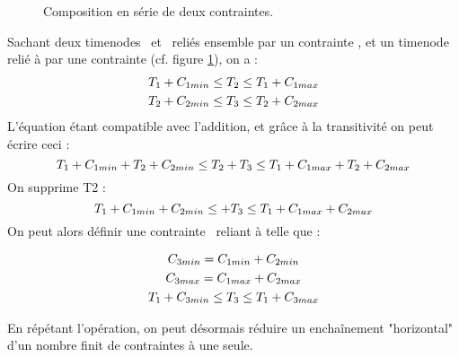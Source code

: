 \begin{figure}[ht]
    \centering
    \caption{Composition en série de deux contraintes. \label{figSerie}}
\end{figure}
\setcounter{equation}{0}
Sachant deux timenodes ~et ~reliés ensemble par un contrainte , et un timenode  relié à  par une contrainte  (cf. figure \ref{figSerie}), on a :
\begin{gather} 
    T_{1} + C_{1min} \leq T_{2} \leq T_{1} + C_{1max}\\
    T_{2} + C_{2min} \leq T_{3} \leq T_{2} + C_{2max}
\end{gather}
L'équation étant compatible avec l'addition, et grâce à la transitivité on peut écrire ceci : 
\begin{equation}
    T_{1} + C_{1min} + T_{2} + C_{2min} \leq T_{2} + T_{3} \leq T_{1} + C_{1max} +         T_{2} + C_{2max}
\end{equation} 
On supprime T2 :
\begin{equation}
    T_{1} + C_{1min} + C_{2min} \leq + T_{3} \leq T_{1} + C_{1max} + C_{2max}
\end{equation}
On peut alors définir une contrainte ~reliant  à  telle que : 

\begin{gather}
    C_{3min} = C_{1min} + C_{2min}\\
    C_{3max} = C_{1max} + C_{2max}\\
    T_{1} + C_{3min} \leq T_{3} \leq T_{1} + C_{3max}
\end{gather}
\setcounter{equation}{0}

En répétant l'opération, on peut désormais réduire un enchaînement "horizontal" d'un nombre finit de contraintes à une seule.

